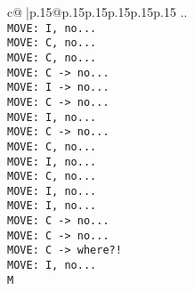 \documentclass{article}
\begin{document}
{\begin{supertabular}{c@{$\;$}|p{.15\linewidth}@{}p{.15\linewidth}p{.15\linewidth}p{.15\linewidth}p{.15\linewidth}p{.15\linewidth}}
{{{..\\ \tt  MOVE: I, no...\\ \tt  MOVE: C, no...\\ \tt  MOVE: C, no...\\ \tt  MOVE: C -> no...\\ \tt  MOVE: I -> no...\\ \tt  MOVE: C -> no...\\ \tt  MOVE: I, no...\\ \tt  MOVE: C -> no...\\ \tt  MOVE: C, no...\\ \tt  MOVE: I, no...\\ \tt  MOVE: C, no...\\ \tt  MOVE: I, no...\\ \tt  MOVE: I, no...\\ \tt  MOVE: C -> no...\\ \tt  MOVE: C -> no...\\ \tt  MOVE: C -> where?!\\ \tt  MOVE: I, no...\\ \tt  M}}}
\end{supertabular}}
\end{document}
